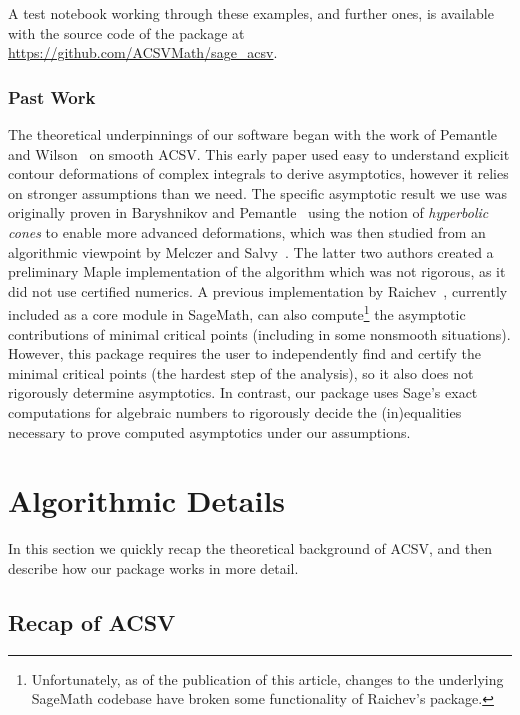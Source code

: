 \documentclass[a4paper]{amsart}
\theoremstyle{definition}
\begin{document}
A test notebook working through these examples, and further ones, is available with the source code
of the package at \url{https://github.com/ACSVMath/sage_acsv}.

\subsubsection*{Past Work}

The theoretical underpinnings of our software began with the work of Pemantle and Wilson~\cite{PemantleWilson2002} on smooth ACSV. This early paper used easy to understand explicit contour deformations of complex integrals to derive asymptotics, however it relies on stronger assumptions than we need. The specific asymptotic result we use was originally proven in Baryshnikov and Pemantle~\cite{BaryshnikovPemantle2011} using the notion of \emph{hyperbolic cones} to enable more advanced deformations, which was then studied from an algorithmic viewpoint by Melczer and Salvy~\cite{MelczerSalvy2021}. The latter two authors created a preliminary Maple implementation of the algorithm which was not rigorous, as it did not use certified numerics. 
A previous implementation by Raichev~\cite{Raichev2011}, currently included as a core module in SageMath,
can also compute\footnote{Unfortunately, as of the publication of this article, changes to the underlying SageMath codebase have broken some functionality of Raichev's package.} the asymptotic contributions of minimal critical points (including in some nonsmooth situations). However, this package requires the user to independently find and certify the minimal critical points (the hardest step of the analysis), so it also does not rigorously determine asymptotics. In contrast, our package uses Sage's exact computations for algebraic numbers to rigorously decide the (in)equalities necessary to prove computed asymptotics under our assumptions.

\section{Algorithmic Details}

In this section we quickly recap the theoretical background of ACSV, and then describe how our package works in more detail.

\subsection{Recap of ACSV}
\end{document}
